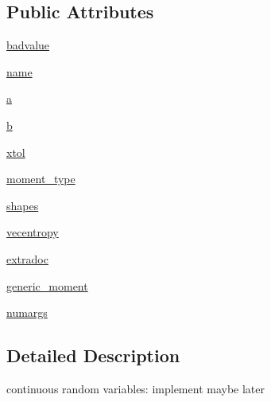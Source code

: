 \subsection*{Public Attributes}
\begin{DoxyCompactItemize}
\item 
\hyperlink{classscipy_1_1stats_1_1__distn__infrastructure_1_1rv__continuous_af03fbf703ea8292fb431dce1a9a71e69}{badvalue}
\item 
\hyperlink{classscipy_1_1stats_1_1__distn__infrastructure_1_1rv__continuous_a2c176479919ea4625dcb6a4e918d0ba0}{name}
\item 
\hyperlink{classscipy_1_1stats_1_1__distn__infrastructure_1_1rv__continuous_ae71d8ac3f706e189b95fba8610a029d2}{a}
\item 
\hyperlink{classscipy_1_1stats_1_1__distn__infrastructure_1_1rv__continuous_a1b4276bbe711c36e9fe9b2588e2d83fa}{b}
\item 
\hyperlink{classscipy_1_1stats_1_1__distn__infrastructure_1_1rv__continuous_a3d732f540d83b1311e9d364c29fce3d3}{xtol}
\item 
\hyperlink{classscipy_1_1stats_1_1__distn__infrastructure_1_1rv__continuous_aecb98d331a5ae1c87647ea1e6fc0b42e}{moment\+\_\+type}
\item 
\hyperlink{classscipy_1_1stats_1_1__distn__infrastructure_1_1rv__continuous_a5c8f5b5f3679977455edbc831408047f}{shapes}
\item 
\hyperlink{classscipy_1_1stats_1_1__distn__infrastructure_1_1rv__continuous_a8066815e3b57a82195a620640a3b6adb}{vecentropy}
\item 
\hyperlink{classscipy_1_1stats_1_1__distn__infrastructure_1_1rv__continuous_aeb539ffe9d7b3b2eb125f888bf939ee0}{extradoc}
\item 
\hyperlink{classscipy_1_1stats_1_1__distn__infrastructure_1_1rv__continuous_a79fb73bfea19711ee83248eb499eb032}{generic\+\_\+moment}
\item 
\hyperlink{classscipy_1_1stats_1_1__distn__infrastructure_1_1rv__continuous_a490ea083dea173aa7d1aff13cb85ae03}{numargs}
\end{DoxyCompactItemize}


\subsection{Detailed Description}
continuous random variables\+: implement maybe later 

